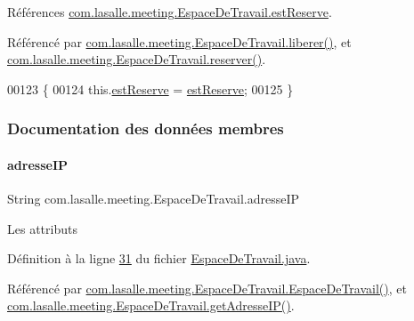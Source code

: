 Références \hyperlink{_espace_de_travail_8java_source_l00038}{com.\+lasalle.\+meeting.\+Espace\+De\+Travail.\+est\+Reserve}.



Référencé par \hyperlink{_espace_de_travail_8java_source_l00145}{com.\+lasalle.\+meeting.\+Espace\+De\+Travail.\+liberer()}, et \hyperlink{_espace_de_travail_8java_source_l00130}{com.\+lasalle.\+meeting.\+Espace\+De\+Travail.\+reserver()}.


\begin{DoxyCode}
00123     \{
00124         this.\hyperlink{classcom_1_1lasalle_1_1meeting_1_1_espace_de_travail_a8913c30ae6b72ae4f35962b1ecfc496b}{estReserve} = \hyperlink{classcom_1_1lasalle_1_1meeting_1_1_espace_de_travail_a8913c30ae6b72ae4f35962b1ecfc496b}{estReserve};
00125     \}
\end{DoxyCode}


\subsubsection{Documentation des données membres}
\mbox{\label{classcom_1_1lasalle_1_1meeting_1_1_espace_de_travail_aa4d9547d0170feeeb49c123e36226b79}} 
\paragraph{\texorpdfstring{adresse\+IP}{adresseIP}}
{\footnotesize\ttfamily String com.\+lasalle.\+meeting.\+Espace\+De\+Travail.\+adresse\+IP\hspace{0.3cm}{\ttfamily [private]}}

Les attributs 

Définition à la ligne \hyperlink{_espace_de_travail_8java_source_l00031}{31} du fichier \hyperlink{_espace_de_travail_8java_source}{Espace\+De\+Travail.\+java}.



Référencé par \hyperlink{_espace_de_travail_8java_source_l00070}{com.\+lasalle.\+meeting.\+Espace\+De\+Travail.\+Espace\+De\+Travail()}, et \hyperlink{_espace_de_travail_8java_source_l00082}{com.\+lasalle.\+meeting.\+Espace\+De\+Travail.\+get\+Adresse\+I\+P()}.

